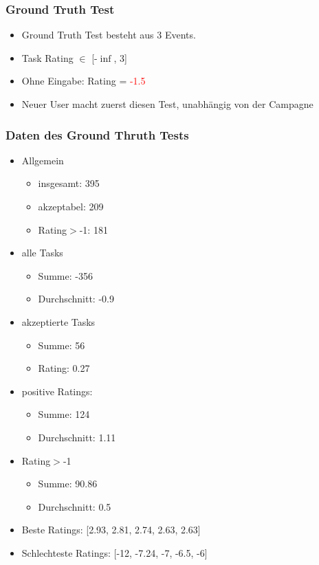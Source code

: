 \documentclass[]{beamer}
\begin{document}
\begin{frame}
	\frametitle{Ground Truth Test}
	\begin{itemize}
		\item Ground Truth Test besteht aus 3 Events.
		\item Task Rating $\in$ [-$\inf$, 3]
		\item Ohne Eingabe: Rating = \textcolor{red}{-1.5}
		\item Neuer User macht zuerst diesen Test, unabhängig von der Campagne
	\end{itemize}
\end{frame}

\begin{frame}
	\frametitle{Daten des Ground Thruth Tests}
	\begin{itemize}
		\item Allgemein
		\begin{itemize}
			\item insgesamt: 395
			\item akzeptabel: 209
			\item Rating$>$-1: 181
		\end{itemize}
		\item alle Tasks
		\begin{itemize}
			\item Summe: -356
			\item Durchschnitt: -0.9
		\end{itemize}
		\item akzeptierte Tasks
		\begin{itemize}
			\item Summe: 56
			\item Rating: 0.27
		\end{itemize}
		\item positive Ratings:
		\begin{itemize}
			\item Summe: 124
			\item Durchschnitt: 1.11
		\end{itemize}
		\item Rating$>$-1
		\begin{itemize}
			\item Summe: 90.86
			\item Durchschnitt: 0.5
		\end{itemize}

		\item Beste Ratings: [2.93, 2.81, 2.74, 2.63, 2.63]
		\item Schlechteste Ratings: [-12, -7.24, -7, -6.5, -6]
	\end{itemize}
\end{frame}
\end{document}
